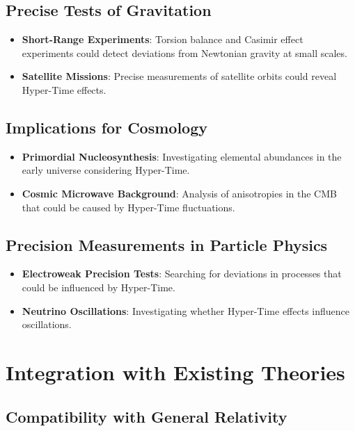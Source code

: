 \documentclass[11pt,a4paper]{article}
\begin{document}
\subsection{Precise Tests of Gravitation}

\begin{itemize}
    \item \textbf{Short-Range Experiments}: Torsion balance and Casimir effect experiments could detect deviations from Newtonian gravity at small scales.
    \item \textbf{Satellite Missions}: Precise measurements of satellite orbits could reveal Hyper-Time effects.
\end{itemize}

\subsection{Implications for Cosmology}

\begin{itemize}
    \item \textbf{Primordial Nucleosynthesis}: Investigating elemental abundances in the early universe considering Hyper-Time.
    \item \textbf{Cosmic Microwave Background}: Analysis of anisotropies in the CMB that could be caused by Hyper-Time fluctuations.
\end{itemize}

\subsection{Precision Measurements in Particle Physics}

\begin{itemize}
    \item \textbf{Electroweak Precision Tests}: Searching for deviations in processes that could be influenced by Hyper-Time.
    \item \textbf{Neutrino Oscillations}: Investigating whether Hyper-Time effects influence oscillations.
\end{itemize}

\section{Integration with Existing Theories}

\subsection{Compatibility with General Relativity}
\end{document}
